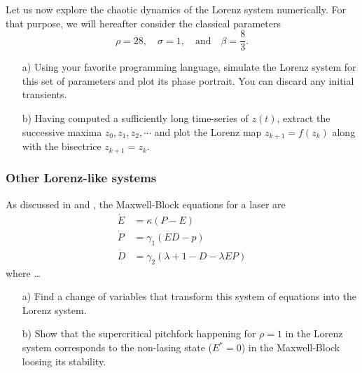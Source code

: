 \begin{problem}
  Let us now explore the chaotic dynamics of the Lorenz system numerically.
  For that purpose, we will hereafter consider the classical parameters
  \[
  \rho = 28, \quad \sigma = 1, \quad \text{and} \quad \beta = \dfrac{8}{3}.
  \]

  \begin{enumerate}
  \item[a)] Using your favorite programming language, simulate the Lorenz system for this set of parameters and plot its phase portrait.
    You can discard any initial transients.

  \item[b)] Having computed a sufficiently long time-series of $z(t)$, extract the successive maxima $z_0, z_1, z_2, \cdots$ and plot the Lorenz map $z_{k+1} = f(z_k)$ along with the bisectrice $z_{k+1} = z_k$.
  \end{enumerate}
\end{problem}

\subsubsection*{Other Lorenz-like systems}

\begin{problem}
  As discussed in \cite{??} and \cite{??}, the Maxwell-Block equations for a laser are
  \[
  \begin{aligned}
    \dot{E} & = \kappa \left( P - E \right) \\
    \dot{P} & = \gamma_1 \left( ED - p \right) \\
    \dot{D} & = \gamma_2 \left( \lambda + 1 - D - \lambda EP \right)
  \end{aligned}
  \]
  where \ldots
  
  \begin{enumerate}
  \item[a)] Find a change of variables that transform this system of equations into the Lorenz system.
  \item[b)] Show that the supercritical pitchfork happening for $\rho = 1$ in the Lorenz system corresponds to the non-lasing state ($E^* = 0$) in the Maxwell-Block loosing its stability.
  \end{enumerate}
\end{problem}

\bigskip

